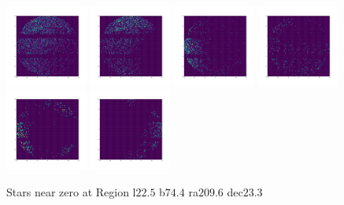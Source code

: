 \documentclass[12pt,prd]{article}
\begin{document}
\begin{figure}[h!]
\includegraphics[width=0.24\textwidth]{../figures/stars_near_zero_2dhistgaiascan_l22_5_b74_4_ra209_6_dec23_3_npy_12.pdf}
\includegraphics[width=0.24\textwidth]{../figures/stars_near_zero_2dhistgaiascan_l22_5_b74_4_ra209_6_dec23_3_npy_13.pdf}
\includegraphics[width=0.24\textwidth]{../figures/stars_near_zero_2dhistgaiascan_l22_5_b74_4_ra209_6_dec23_3_npy_14.pdf}
\includegraphics[width=0.24\textwidth]{../figures/stars_near_zero_2dhistgaiascan_l22_5_b74_4_ra209_6_dec23_3_npy_15.pdf}
\includegraphics[width=0.24\textwidth]{../figures/stars_near_zero_2dhistgaiascan_l22_5_b74_4_ra209_6_dec23_3_npy_16.pdf}
\includegraphics[width=0.24\textwidth]{../figures/stars_near_zero_2dhistgaiascan_l22_5_b74_4_ra209_6_dec23_3_npy_17.pdf}
\caption{Stars near zero at Region l$22.5$ b$74.4$ ra$209.6$ dec$23.3$}
\end{figure}
\end{document}
